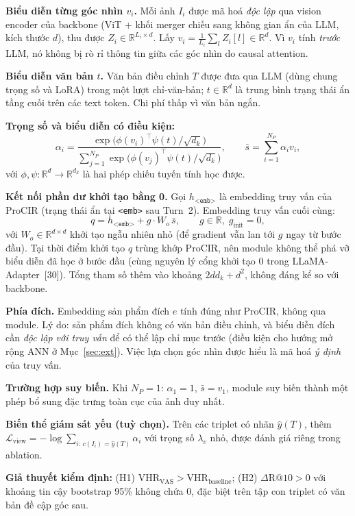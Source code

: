 \documentclass[a4paper]{article}
\newcommand{\emb}{\texttt{<emb>}}
\begin{document}
\textbf{Biểu diễn từng góc nhìn $v_i$.} Mỗi ảnh $I_i$ được mã hoá \textit{độc lập} qua vision encoder của backbone (ViT + khối merger chiếu sang không gian ẩn của LLM, kích thước $d$), thu được $Z_i \in \mathbb{R}^{L_i \times d}$. Lấy $v_i = \frac{1}{L_i}\sum_{l} Z_i[l] \in \mathbb{R}^{d}$. Vì $v_i$ tính \textit{trước} LLM, nó không bị rò rỉ thông tin giữa các góc nhìn do causal attention.

\textbf{Biểu diễn văn bản $t$.} Văn bản điều chỉnh $T$ được đưa qua LLM (dùng chung trọng số và LoRA) trong một lượt chỉ-văn-bản; $t \in \mathbb{R}^{d}$ là trung bình trạng thái ẩn tầng cuối trên các text token. Chi phí thấp vì văn bản ngắn.

\textbf{Trọng số và biểu diễn có điều kiện:}
\[
\alpha_i = \frac{\exp\!\big(\phi(v_i)^\top \psi(t)/\sqrt{d_k}\big)}{\sum_{j=1}^{N_P}\exp\!\big(\phi(v_j)^\top \psi(t)/\sqrt{d_k}\big)},\qquad \bar{s} = \sum_{i=1}^{N_P}\alpha_i v_i,
\]
với $\phi,\psi: \mathbb{R}^{d}\to\mathbb{R}^{d_k}$ là hai phép chiếu tuyến tính học được.

\textbf{Kết nối phần dư khởi tạo bằng 0.} Gọi $h_{\emb}$ là embedding truy vấn của ProCIR (trạng thái ẩn tại \emb{} sau Turn~2). Embedding truy vấn cuối cùng:
\[
q = h_{\emb} + g \cdot W_o\,\bar{s}, \qquad g \in \mathbb{R},\; g_{\text{init}} = 0,
\]
với $W_o \in \mathbb{R}^{d\times d}$ khởi tạo ngẫu nhiên nhỏ (để gradient vẫn lan tới $g$ ngay từ bước đầu). Tại thời điểm khởi tạo $q$ trùng khớp ProCIR, nên module không thể phá vỡ biểu diễn đã học ở bước đầu (cùng nguyên lý cổng khởi tạo 0 trong LLaMA-Adapter~[30]). Tổng tham số thêm vào khoảng $2dd_k + d^2$, không đáng kể so với backbone.

\textbf{Phía đích.} Embedding sản phẩm đích $e$ tính đúng như ProCIR, không qua module. Lý do: sản phẩm đích không có văn bản điều chỉnh, và biểu diễn đích cần \textit{độc lập với truy vấn} để có thể lập chỉ mục trước (điều kiện cho hướng mở rộng ANN ở Mục~\ref{sec:ext}). Việc lựa chọn góc nhìn được hiểu là mã hoá \textit{ý định} của truy vấn.

\textbf{Trường hợp suy biến.} Khi $N_P=1$: $\alpha_1=1$, $\bar{s}=v_1$, module suy biến thành một phép bổ sung đặc trưng toàn cục của ảnh duy nhất.

\textbf{Biến thể giám sát yếu (tuỳ chọn).} Trên các triplet có nhãn $\hat{y}(T)$, thêm $\mathcal{L}_{\text{view}} = -\log \sum_{i:\,c(I_i)=\hat{y}(T)} \alpha_i$ với trọng số $\lambda_v$ nhỏ, được đánh giá riêng trong ablation.

\textbf{Giả thuyết kiểm định:} (H1) $\text{VHR}_{\text{VAS}} > \text{VHR}_{\text{baseline}}$; (H2) $\Delta\text{R@10} > 0$ với khoảng tin cậy bootstrap 95\% không chứa 0, đặc biệt trên tập con triplet có văn bản đề cập góc sau.
\end{document}
